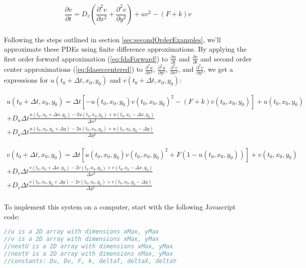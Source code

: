 {   \begin{equation}
  \frac{\partial v}{\partial t} = D_{v}\left(\frac{\partial^{2} v}{\partial x^{2}}+\frac{\partial^{2} v}{\partial y^{2}} \right) +uv^{2} - (F+k)v
  \end{equation}
  \\
  Following the steps outlined in section \ref{sec:secondOrderExamples}, we'll approximate these PDEs using finite difference approximations.  By applying the first order forward approximation (\ref{eq:fdaForward}) to $\frac{\partial u}{\partial t}$ and $\frac{\partial v}{\partial t}$ and second order center approximations (\ref{eq:fdaseccentered}) to $\frac{\partial^{2} u}{\partial x^{2}}$, $\frac{\partial^{2} u}{\partial y^{2}}$, $\frac{\partial^{2} v}{\partial x^{2}}$, and $\frac{\partial^{2} v}{\partial y^{2}}$, we get a expressions for $u(t_{0} + \Delta  t, x_{0}, y_{0})$ and $v(t_{0} + \Delta  t, x_{0}, y_{0})$:
  
   \begin{multline}\label{eq:gsdifferentialu}
    u(t_{0} + \Delta  t, x_{0}, y_{0}) = \Delta  t[-u(t_{0}, x_{0}, y_{0})v(t_{0}, x_{0}, y_{0})^{2} - (F+k)v(t_{0}, x_{0}, y_{0})] + u(t_{0}, x_{0}, y_{0})\\
    + D_{u}\Delta  t\frac{u(t_{0},x_{0} + \Delta  x, y_{0})- 2u(t_{0},x_{0}, y_{0}) + u(t_{0},x_{0} -\Delta  x, y_{0})}{\Delta  x^{2}} \\
    + D_{u}\Delta  t\frac{u(t_{0},x_{0} , y_{0}+ \Delta  y)- 2u(t_{0},x_{0}, y_{0}) + u(t_{0},x_{0} , y_{0}-\Delta  y)}{\Delta  y^{2}}
  \end{multline}
  
    \begin{multline}\label{eq:gsdifferentialv}
    v(t_{0} + \Delta  t, x_{0}, y_{0}) = \Delta  t[u(t_{0}, x_{0}, y_{0})v(t_{0}, x_{0}, y_{0})^{2} + F(1-u(t_{0}, x_{0}, y_{0}))] + v(t_{0}, x_{0}, y_{0})\\
    + D_{v}\Delta  t\frac{v(t_{0},x_{0} + \Delta  x, y_{0})- 2v(t_{0},x_{0}, y_{0}) + v(t_{0},x_{0} -\Delta  x, y_{0})}{\Delta  x^{2}} \\
    + D_{v}\Delta  t\frac{v(t_{0},x_{0} , y_{0}+ \Delta  y)- 2v(t_{0},x_{0}, y_{0}) + v(t_{0},x_{0} , y_{0}-\Delta  y)}{\Delta  y^{2}}
  \end{multline}
  \\
  To implement this system on a computer, start with the following Javascript code:

\begin{lstlisting}[language=JavaScript]
//u is a 2D array with dimensions xMax, yMax
//v is a 2D array with dimensions xMax, yMax
//nextU is a 2D array with dimensions xMax, yMax
//nextV is a 2D array with dimensions xMax, yMax
//constants: Du, Dv, F, k, deltaT, deltaX, deltaY


\end{lstlisting}}
